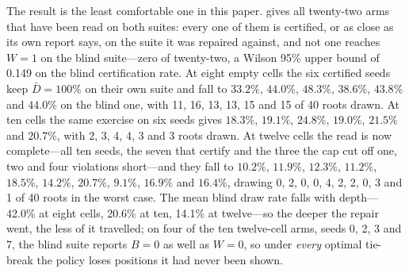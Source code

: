 \documentclass[conference]{IEEEtran}
\begin{document}
The result is the least comfortable one in this paper.  gives all twenty-two arms that have been read on both suites: every one of them is certified, or as close as its own report says, on the suite it was repaired against, and not one reaches $W=1$ on the blind suite---zero of twenty-two, a Wilson 95\% upper bound of 0.149 on the blind certification rate. At eight empty cells the six certified seeds keep $\bar D=100\%$ on their own suite and fall to $33.2\%$, $44.0\%$, $48.3\%$, $38.6\%$, $43.8\%$ and $44.0\%$ on the blind one, with 11, 16, 13, 13, 15 and 15 of 40 roots drawn. At ten cells the same exercise on six seeds gives $18.3\%$, $19.1\%$, $24.8\%$, $19.0\%$, $21.5\%$ and $20.7\%$, with 2, 3, 4, 4, 3 and 3 roots drawn. At twelve cells the read is now complete---all ten seeds, the seven that certify and the three the cap cut off one, two and four violations short---and they fall to $10.2\%$, $11.9\%$, $12.3\%$, $11.2\%$, $18.5\%$, $14.2\%$, $20.7\%$, $9.1\%$, $16.9\%$ and $16.4\%$, drawing 0, 2, 0, 0, 4, 2, 2, 0, 3 and 1 of 40 roots in the worst case. The mean blind draw rate falls with depth---42.0\% at eight cells, 20.6\% at ten, 14.1\% at twelve---so the deeper the repair went, the less of it travelled; on four of the ten twelve-cell arms, seeds 0, 2, 3 and 7, the blind suite reports $B=0$ as well as $W=0$, so under \emph{every} optimal tie-break the policy loses positions it had never been shown.
\end{document}
